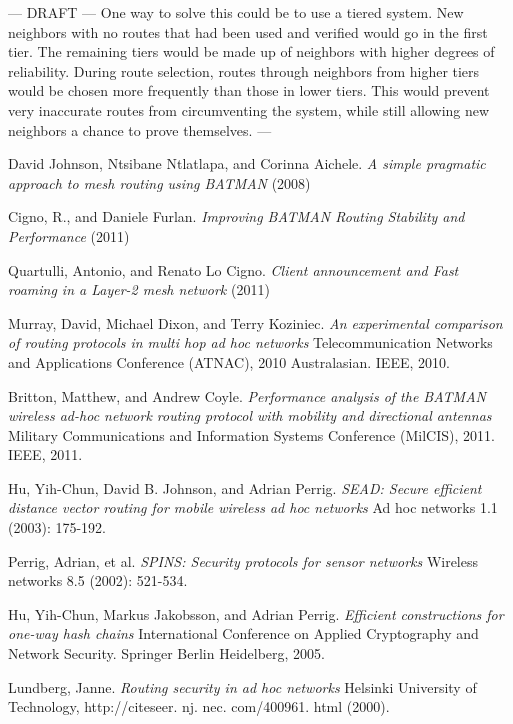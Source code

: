 \documentclass[11pt]{article}
\begin{document}
--- DRAFT ---
One way to solve this could be to use a tiered system. New neighbors with no routes that had been used and verified would go in the first tier. The remaining tiers would be made up of neighbors with higher degrees of reliability. During route selection, routes through neighbors from higher tiers would be chosen more frequently than those in lower tiers. This would prevent very inaccurate routes from circumventing the system, while still allowing new neighbors a chance to prove themselves.
---
\medskip


\begin{thebibliography}{1}
	
	
	
	David Johnson, Ntsibane Ntlatlapa, and Corinna Aichele.
	\textit{A simple pragmatic approach to mesh routing using BATMAN} (2008)
	
	Cigno, R., and Daniele Furlan.
	\textit{Improving BATMAN Routing Stability and Performance} (2011)
	
	Quartulli, Antonio, and Renato Lo Cigno.
	\textit{Client announcement and Fast roaming in a Layer-2 mesh network} (2011)
	
	Murray, David, Michael Dixon, and Terry Koziniec.
	\textit{An experimental comparison of routing protocols in multi hop ad hoc networks} Telecommunication Networks and Applications Conference (ATNAC), 2010 Australasian. IEEE, 2010.
	
	Britton, Matthew, and Andrew Coyle.
	\textit{Performance analysis of the BATMAN wireless ad-hoc network routing protocol with mobility and directional antennas} Military Communications and Information Systems Conference (MilCIS), 2011. IEEE, 2011.
	
	Hu, Yih-Chun, David B. Johnson, and Adrian Perrig. 
	\textit{SEAD: Secure efficient distance vector routing for mobile wireless ad hoc networks} Ad hoc networks 1.1 (2003): 175-192.
	
	Perrig, Adrian, et al. 
	\textit{SPINS: Security protocols for sensor networks} Wireless networks 8.5 (2002): 521-534.
	
	Hu, Yih-Chun, Markus Jakobsson, and Adrian Perrig. 
	\textit{Efficient constructions for one-way hash chains} International Conference on Applied Cryptography and Network Security. Springer Berlin Heidelberg, 2005.
	
	Lundberg, Janne. 
	\textit{Routing security in ad hoc networks} Helsinki University of Technology, http://citeseer. nj. nec. com/400961. html (2000).
	
\end{thebibliography}
\end{document}
